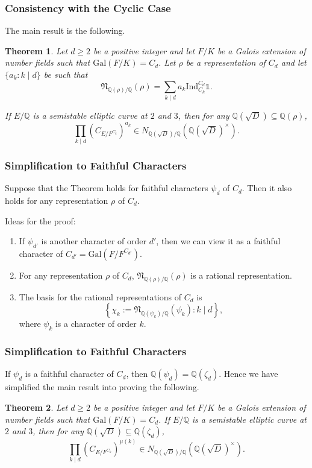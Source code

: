 \documentclass{beamer}
\newcommand{\Gal}{\mathrm{Gal}}
\newcommand{\Ind}{\mathrm{Ind}}
\newcommand{\QQ}{\mathbb{Q}}
\newcommand{\repnorm}[1]{\mathfrak{N}_{\QQ(#1) / \QQ}(#1)}
\theoremstyle{plain}
\newtheorem{thm}{Theorem}[section]
\begin{document}
\begin{frame}
    \frametitle{Consistency with the Cyclic Case}
    The main result is the following.
    \begin{thm}
        Let $d\geq2$ be a positive integer and let $F/K$ be a Galois extension of number fields such that $\Gal(F/K)=C_d$. Let $\rho$ be a representation of $C_d$ and let $\{a_k:k\mid d\}$ be such that $$\repnorm{\rho}=\sum_{k\mid d}a_k\Ind_{C_k}^{C_d}\mathds{1}.$$
    
        If $E/\QQ$ is a semistable elliptic curve at $2$ and $3$, then for any $\QQ(\sqrt{D})\subseteq\QQ(\rho)$,
        $$\prod_{k\mid d}(C_{E/F^{C_k}})^{a_k}\in N_{\QQ(\sqrt{D})/\QQ}(\QQ(\sqrt{D})^{\times}).$$
    \end{thm}

\end{frame}


\begin{frame}
    \frametitle{Simplification to Faithful Characters}

    \begin{lemma}
        Suppose that the Theorem holds for faithful characters $\psi_d$ of $C_d$. Then it also holds for any representation $\rho$ of $C_d$.
    \end{lemma}

    Ideas for the proof:
    \begin{enumerate}
        \item If $\psi_{d'}$ is another character of order $d'$, then we can view it as a faithful character of $C_{d'}=\Gal(F/F^{C_{d'}})$.
        \item For any representation $\rho$ of $C_d$, $\repnorm{\rho}$ is a rational representation.
        \item The basis for the rational representations of $C_d$ is 
        $$\left\{\chi_k:=\repnorm{\psi_k}:k\mid d\right\},$$
        where $\psi_k$ is a character of order $k$.
    \end{enumerate}

\end{frame}

\begin{frame}
    \frametitle{Simplification to Faithful Characters}
    If $\psi_d$ is a faithful character of $C_d$, then $\QQ(\psi_d)=\QQ(\zeta_d)$. Hence we have simplified the main result into proving the following.
    \begin{thm}
        Let $d\geq2$ be a positive integer and let $F/K$ be a Galois extension of number fields such that $\Gal(F/K)=C_d$. If $E/\QQ$ is a semistable elliptic curve at $2$ and $3$, then for any $\QQ(\sqrt{D})\subseteq\QQ(\zeta_d)$,
        $$\prod_{k\mid d}(C_{E/F^{C_k}})^{\mu(k)}\in N_{\QQ(\sqrt{D})/\QQ}(\QQ(\sqrt{D})^{\times}).$$
    \end{thm}
\end{frame}
\end{document}
